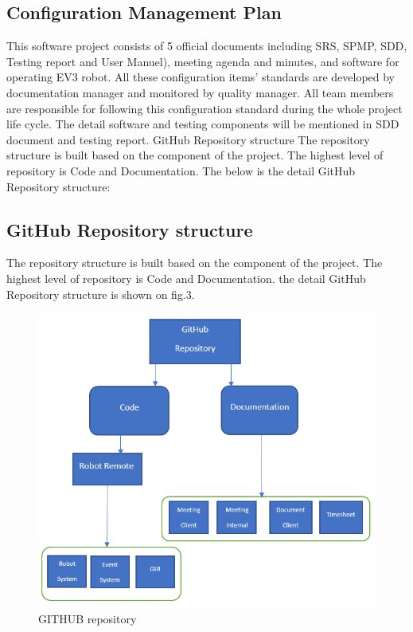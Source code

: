 \subsection{Configuration Management Plan}
This software project consists of 5 official documents including SRS, SPMP, SDD, Testing report and User Manuel), meeting agenda and minutes, and software for operating EV3 robot. All these configuration items’ standards are developed by documentation manager and monitored by quality manager. All team members are responsible for following this configuration standard during the whole project life cycle. The detail software and testing components will be mentioned in SDD document and testing report.
GitHub Repository structure
The repository structure is built based on the component of the project. The highest level of repository is Code and Documentation. The below is the detail GitHub Repository structure:

\subsection{GitHub Repository structure}
The repository structure is built based on the component of the project. The highest level of repository is Code and Documentation. the detail GitHub Repository structure is shown on fig.3.

\begin{figure}[H]
	\includegraphics[width=\linewidth]{GIT.png}  %
	\caption{GITHUB repository}
	\label{fig:GITHUB repository}				
\end{figure}

